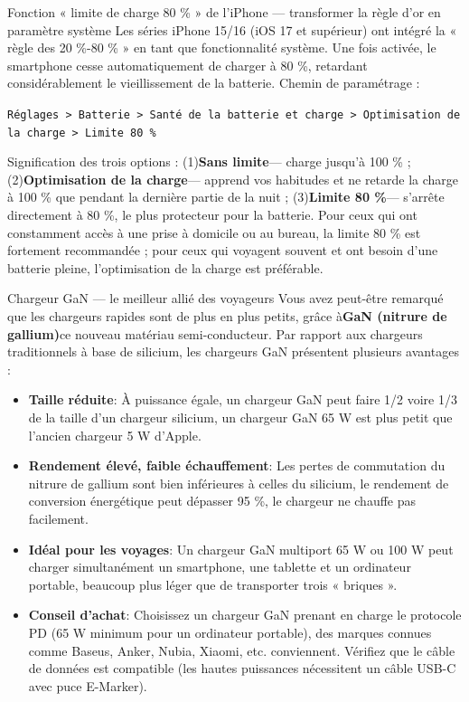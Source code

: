 \begin{tcbinfo}{Fonction « limite de charge 80 \% » de l'iPhone — transformer la règle d'or en paramètre système}
Les séries iPhone 15/16 (iOS 17 et supérieur) ont intégré la « règle des 20 \%-80 \% » en tant que fonctionnalité système. Une fois activée, le smartphone cesse automatiquement de charger à 80 \%, retardant considérablement le vieillissement de la batterie. Chemin de paramétrage :

\texttt{Réglages > Batterie > Santé de la batterie et charge > Optimisation de la charge > Limite 80 \%}

Signification des trois options : (1)\textbf{Sans limite}— charge jusqu'à 100 \% ; (2)\textbf{Optimisation de la charge}— apprend vos habitudes et ne retarde la charge à 100 \% que pendant la dernière partie de la nuit ; (3)\textbf{Limite 80 \%}— s'arrête directement à 80 \%, le plus protecteur pour la batterie. Pour ceux qui ont constamment accès à une prise à domicile ou au bureau, la limite 80 \% est fortement recommandée ; pour ceux qui voyagent souvent et ont besoin d'une batterie pleine, l'optimisation de la charge est préférable.

\end{tcbinfo}

\begin{tcbinfo}{Chargeur GaN — le meilleur allié des voyageurs}
Vous avez peut-être remarqué que les chargeurs rapides sont de plus en plus petits, grâce à\textbf{GaN (nitrure de gallium)}ce nouveau matériau semi-conducteur. Par rapport aux chargeurs traditionnels à base de silicium, les chargeurs GaN présentent plusieurs avantages :

\begin{itemize}
  \item \textbf{Taille réduite}: À puissance égale, un chargeur GaN peut faire 1/2 voire 1/3 de la taille d'un chargeur silicium, un chargeur GaN 65 W est plus petit que l'ancien chargeur 5 W d'Apple.
  \item \textbf{Rendement élevé, faible échauffement}: Les pertes de commutation du nitrure de gallium sont bien inférieures à celles du silicium, le rendement de conversion énergétique peut dépasser 95 \%, le chargeur ne chauffe pas facilement.
  \item \textbf{Idéal pour les voyages}: Un chargeur GaN multiport 65 W ou 100 W peut charger simultanément un smartphone, une tablette et un ordinateur portable, beaucoup plus léger que de transporter trois « briques ».
  \item \textbf{Conseil d'achat}: Choisissez un chargeur GaN prenant en charge le protocole PD (65 W minimum pour un ordinateur portable), des marques connues comme Baseus, Anker, Nubia, Xiaomi, etc. conviennent. Vérifiez que le câble de données est compatible (les hautes puissances nécessitent un câble USB-C avec puce E-Marker).
\end{itemize}

\end{tcbinfo}

